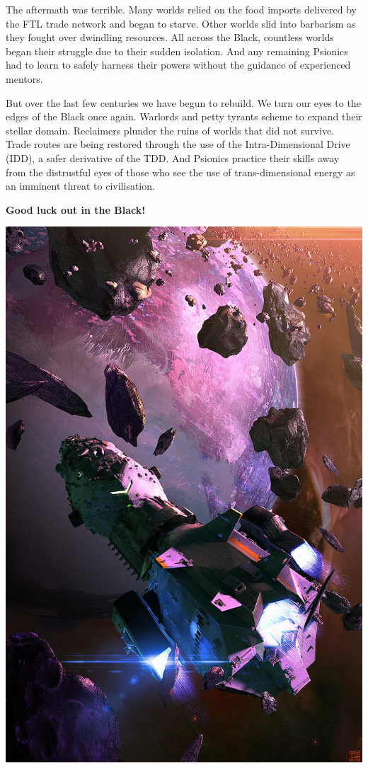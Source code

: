 \documentclass[10pt,twoside]{article}
\begin{document}
\begin{multicols}{2}
  The aftermath was terrible. Many worlds relied on the food imports delivered by the FTL trade network and began to starve. Other worlds slid into barbarism as they fought over dwindling resources. All across the Black, countless worlds began their struggle due to their sudden isolation. And any remaining Psionics had to learn to safely harness their powers without the guidance of experienced mentors.

  But over the last few centuries we have begun to rebuild. We turn our eyes to the edges of the Black once again. Warlords and petty tyrants scheme to expand their stellar domain. Reclaimers plunder the ruins of worlds that did not survive. Trade routes are being restored through the use of the Intra-Dimensional Drive (IDD), a safer derivative of the TDD. And Psionics practice their skills away from the distrustful eyes of those who see the use of trans-dimensional energy as an imminent threat to civilisation.

  \textbf{Good luck out in the Black!}

  \vspace{\baselineskip}

  \includegraphics[width=\linewidth]{rebellion_of_stars___starship_blackbeard_by_hideyoshi-d8p607x}


\end{multicols}
\end{document}
